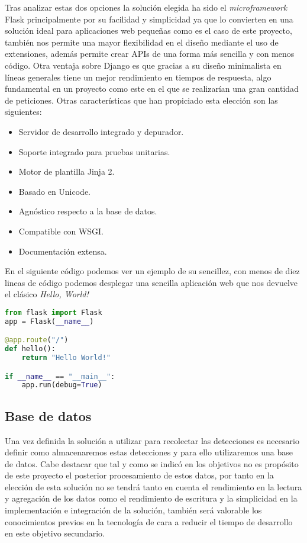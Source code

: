 \documentclass[../proyecto.tex]{subfiles}
\begin{document}
Tras analizar estas dos opciones la solución elegida ha sido el \textit{microframework} Flask principalmente por su facilidad y simplicidad ya que lo convierten en una solución ideal para aplicaciones web pequeñas como es el caso de este proyecto, también nos permite una mayor flexibilidad en el diseño mediante el uso de extensiones, además permite crear APIs de una forma más sencilla y con menos código. Otra ventaja sobre Django es que gracias a su diseño minimalista en líneas generales tiene un mejor rendimiento en tiempos de respuesta, algo fundamental en un proyecto como este en el que se realizarían una gran cantidad de peticiones. Otras características que han propiciado esta elección son las siguientes:

\begin{itemize}
  \item Servidor de desarrollo integrado y depurador.
  \item Soporte integrado para pruebas unitarias.
  \item Motor de plantilla Jinja 2.
  \item Basado en Unicode.
  \item Agnóstico respecto a la base de datos.
  \item Compatible con WSGI.
  \item Documentación extensa.
\end{itemize}

En el siguiente código podemos ver un ejemplo de su sencillez, con menos de diez lineas de código podemos desplegar una sencilla aplicación web que nos devuelve el clásico \textit{Hello, World!}\\

\begin{minipage}{\linewidth}
\begin{lstlisting}[language=Python, caption=Ejemplo de aplicación web básica con Flask, captionpos=b, frame=single]
from flask import Flask
app = Flask(__name__)

@app.route("/")
def hello():
    return "Hello World!"

if __name__ == "__main__":
    app.run(debug=True)
\end{lstlisting}
\end{minipage}

\subsection{Base de datos}

 Una vez definida la solución a utilizar para recolectar las detecciones es necesario definir como almacenaremos estas detecciones y para ello utilizaremos una base de datos. Cabe destacar que tal y como se indicó en los objetivos no es propósito de este proyecto el posterior procesamiento de estos datos, por tanto en la elección de esta solución no se tendrá tanto en cuenta el rendimiento en la lectura y agregación de los datos como el rendimiento de escritura y la simplicidad en la implementación e integración de la solución, también será valorable los conocimientos previos en la tecnología de cara a reducir el tiempo de desarrollo en este objetivo secundario.\\
\end{document}
